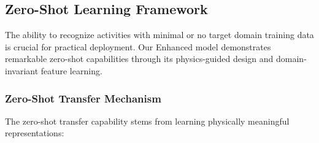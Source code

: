 \documentclass[journal]{IEEEtran}
\begin{document}
\subsection{Zero-Shot Learning Framework}

The ability to recognize activities with minimal or no target domain training data is crucial for practical deployment. Our Enhanced model demonstrates remarkable zero-shot capabilities through its physics-guided design and domain-invariant feature learning.

\subsubsection{Zero-Shot Transfer Mechanism}

The zero-shot transfer capability stems from learning physically meaningful representations:
\end{document}
